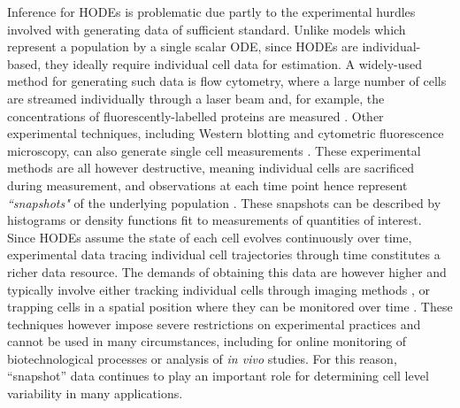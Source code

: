 Inference for HODEs is problematic due partly to the experimental hurdles involved with generating data of sufficient standard. Unlike models which represent a population by a single scalar ODE, since HODEs are individual-based, they ideally require individual cell data for estimation. A widely-used method for generating such data is flow cytometry, where a large number of cells are streamed individually through a laser beam and, for example, the concentrations of fluorescently-labelled proteins are measured \cite{telford2012flow}. Other experimental techniques, including Western blotting and cytometric fluorescence microscopy, can also generate single cell measurements \cite{hughes2014single,hasenauer2011identification}. These experimental methods are all however destructive, meaning individual cells are sacrificed during measurement, and  observations at each time point hence represent \emph{``snapshots"} of the underlying population \cite{hasenauer2011identification}. These snapshots can be described by histograms \cite{dixit2018maximum} or density functions \cite{waldherr2018estimation} fit to measurements of quantities of interest. Since HODEs assume the state of each cell evolves continuously over time, experimental data tracing individual cell trajectories through time constitutes a richer data resource. The demands of obtaining this data are however higher and typically involve either tracking individual cells through imaging methods \cite{hilsenbeck2016software}, or trapping cells in a spatial position where they can be monitored over time \cite{fritzsch2012single}. These techniques however impose severe restrictions on experimental practices and cannot be used in many circumstances, including for online monitoring of biotechnological processes or analysis of \textit{in vivo} studies. For this reason, ``snapshot'' data continues to play an important role for determining cell level variability in many applications.

